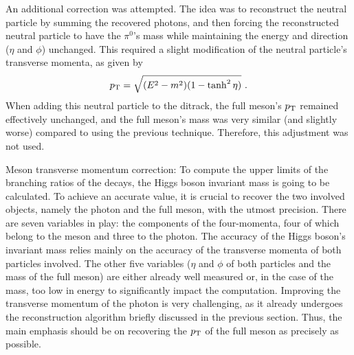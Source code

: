 \begin{myitemlist}
    An additional correction was attempted. The idea was to reconstruct the neutral particle by summing the recovered photons, and then forcing the reconstructed neutral particle to have the $\pi^0$'s mass while maintaining the energy and direction ($\eta$ and $\phi$) unchanged. This required a slight modification of the neutral particle's transverse momenta, as given by
    \begin{equation*}
        p_\text{T} = \sqrt{(E^2 - m^2)(1-\tanh^2\eta)}\ .
    \end{equation*}
    When adding this neutral particle to the ditrack, the full meson's $p_\text{T}$ remained effectively unchanged, and the full meson's mass was very similar (and slightly worse) compared to using the previous technique. Therefore, this adjustment was not used.

    \item[Meson transverse momentum correction:] To compute the upper limits of the branching ratios of the decays, the Higgs boson invariant mass is going to be calculated. To achieve an accurate value, it is crucial to recover the two involved objects, namely the photon and the full meson, with the utmost precision. There are seven variables in play: the components of the four-momenta, four of which belong to the meson and three to the photon. The accuracy of the Higgs boson's invariant mass relies mainly on the accuracy of the transverse momenta of both particles involved. The other five variables ($\eta$ and $\phi$ of both particles and the mass of the full meson) are either already well measured or, in the case of the mass, too low in energy to significantly impact the computation. Improving the transverse momentum of the photon is very challenging, as it already undergoes the reconstruction algorithm briefly discussed in the previous section. Thus, the main emphasis should be on recovering the $p_\text{T}$ of the full meson as precisely as possible.
    

\end{myitemlist}
